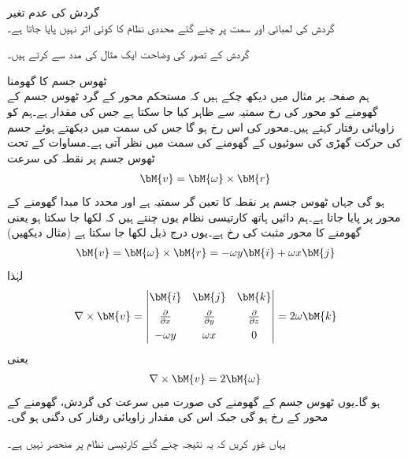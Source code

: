 \quad گردش کی عدم تغیر\\
گردش کی لمبائی اور سمت پر چنے گئے محددی نظام کا کوئی اثر نہیں پایا جاتا ہے۔

گردش کے تصور کی  وضاحت ایک مثال کی مدد سے کرتے ہیں۔

\quad ٹھوس جسم کا گھومنا\\
ہم صفحہ  پر مثال  میں دیکھ چکے ہیں کہ مستحکم محور کے گرد ٹھوس جسم کے گھومنے کو محور کی رخ سمتیہ
  سے ظاہر کیا جا سکتا ہے جس کی مقدار  ہے۔ہم  کو زاویائی رفتار کہتے ہیں۔محور کی اس رخ ہو گا جس کی سمت میں دیکھتے ہوئے  جسم کی حرکت گھڑی کی سوئیوں کے گھومنے کی سمت میں نظر آتی ہے۔مساوات  کے تحت ٹھوس جسم پر نقطہ  کی سرعت
\begin{align*}
\bM{v}=\bM{\omega}\times \bM{r}
\end{align*}
ہو گی  جہاں  ٹھوس جسم پر نقطہ  کا تعین گر سمتیہ   ہے اور محدد کا مبدا گھومنے کے محور پر پایا جاتا ہے۔ہم دائیں ہاتھ کارتیسی نظام یوں چنتے ہیں کہ  لکھا جا سکتا ہو یعنی گھومنے کا محور مثبت  کی رخ ہے۔یوں درج ذیل لکھا جا سکتا ہے (مثال  دیکھیں)
\begin{align*}
\bM{v}=\bM{\omega}\times \bM{r}=-\omega y\bM{i}+\omega x\bM{j}
\end{align*} 
لہٰذا
\begin{align*}
\nabla \times \bM{v}=
\begin{vmatrix}
\bM{i}&\bM{j}&\bM{k}\\[0.5em]
\frac{\partial}{\partial x}& \frac{\partial}{\partial y}&\frac{\partial}{\partial z}\\[0.5em]
-\omega y&\omega x&0
\end{vmatrix}=
2\omega \bM{k}
\end{align*}
یعنی
\begin{align}
\nabla \times \bM{v}=2\bM{\omega}
\end{align}
ہو گا۔یوں ٹھوس جسم کے گھومنے کی صورت میں سرعت کی گردش، گھومنے کے  محور کے رخ ہو گی  جبکہ اس کی مقدار زاویائی رفتار کی دگنی  ہو گی۔

یہاں غور کریں کہ یہ نتیجہ چنے گئے کارتیسی نظام پر منحصر نہیں ہے۔ 

